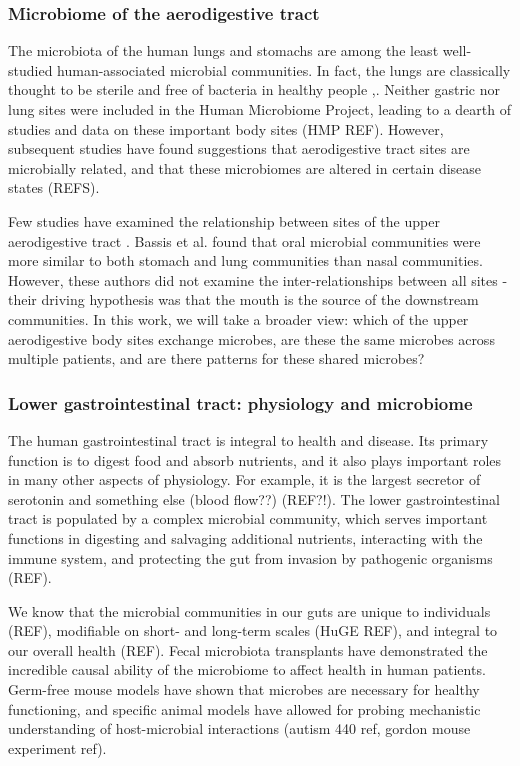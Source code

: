 \documentclass[12pt]{article}
\begin{document}
\subsubsection{Microbiome of the aerodigestive tract}
The microbiota of the human lungs and stomachs are among the least 
well-studied human-associated microbial communities. In fact, the 
lungs are classically thought to be sterile and free of bacteria in 
healthy people \cite{charslon-topographical-2011},\cite{bassis-source-2015}. 
Neither gastric nor lung sites were included in the 
Human Microbiome Project, leading to a dearth of studies and data on 
these important body sites (HMP REF). However, subsequent studies have 
found suggestions that aerodigestive tract sites are microbially 
related, and that these microbiomes are altered in certain disease 
states (REFS).

Few studies have examined the relationship between sites of the upper 
aerodigestive tract \cite{bassis-source-2015}. Bassis et al. found 
that oral microbial communities were more similar to both stomach and 
lung communities than nasal communities. However, these authors did 
not examine the inter-relationships between all sites - their driving 
hypothesis was that the mouth is the source of the downstream 
communities. In this work, we will take a broader view: which of the 
upper aerodigestive body sites exchange microbes, are these the same 
microbes across multiple patients, and are there  patterns for these 
shared microbes? 

\subsubsection{Lower gastrointestinal tract: physiology and microbiome}
The human gastrointestinal tract is integral to health and disease. 
Its primary function is to digest food and absorb nutrients, and it 
also plays important roles in many other aspects of physiology. For 
example, it is the largest secretor of serotonin and something else 
(blood flow??) (REF?!). The lower gastrointestinal tract is populated 
by a complex microbial community, which serves important functions in 
digesting and salvaging additional nutrients, interacting with the 
immune system, and protecting the gut from invasion by pathogenic 
organisms (REF). 

We know that the microbial communities in our guts are unique to 
individuals (REF), modifiable on short- and long-term scales (HuGE REF), and integral to our overall health (REF). 
Fecal microbiota transplants have demonstrated the incredible
causal ability of the microbiome to affect health in 
human patients. Germ-free mouse models have shown that microbes are
necessary for healthy functioning, and specific animal models have  
allowed for probing mechanistic understanding of host-microbial 
interactions (autism 440 ref, gordon mouse experiment ref). 
\end{document}
